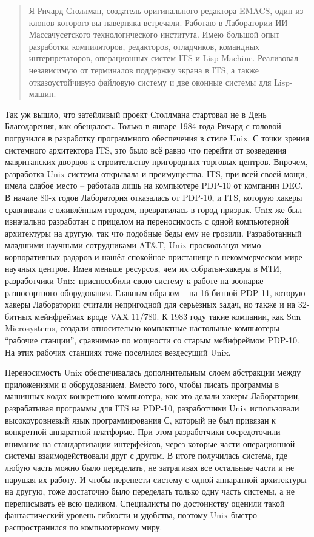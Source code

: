 \begin{quote}
Я Ричард Столлман, создатель оригинального редактора EMACS, один из клонов которого вы наверняка встречали. Работаю в Лаборатории ИИ Массачусетского технологического института. Имею большой опыт разработки компиляторов, редакторов, отладчиков, командных интерпретаторов, операционных систем ITS и Lisp Machine. Реализовал независимую от терминалов поддержку экрана в ITS, а также отказоустойчивую файловую систему и две оконные системы для Lisp-машин.
\end{quote}

Так уж вышло, что затейливый проект Столлмана стартовал не в День Благодарения, как обещалось. Только в январе 1984 года Ричард с головой погрузился в разработку программного обеспечения в стиле Unix. С точки зрения системного архитектора ITS, это было всё равно что перейти от возведения мавританских дворцов к строительству пригородных торговых центров. Впрочем, разработка Unix-системы открывала и преимущества. ITS, при всей своей мощи, имела слабое место -- работала лишь на компьютере PDP-10 от компании DEC. В начале 80-х годов Лаборатория отказалась от PDP-10, и ITS, которую хакеры сравнивали с оживлённым городом, превратилась в город-призрак. Unix же был изначально разработан с прицелом на переносимость с одной компьютерной архитектуры на другую, так что подобные беды ему не грозили. Разработанный младшими научными сотрудниками AT\&T, Unix проскользнул мимо корпоративных радаров и нашёл спокойное пристанище в некоммерческом мире научных центров. Имея меньше ресурсов, чем их собратья-хакеры в МТИ, разработчики Unix приспособили свою систему к работе на зоопарке разносортного оборудования. Главным образом -- на 16-битной PDP-11, которую хакеры Лаборатории считали непригодной для серьёзных задач, но также и на 32-битных мейнфреймах вроде VAX 11/780. К 1983 году такие компании, как Sun Microsystems, создали относительно компактные настольные компьютеры -- \enquote{рабочие станции}, сравнимые по мощности со старым мейнфреймом PDP-10. На этих рабочих станциях тоже поселился вездесущий Unix.

Переносимость Unix обеспечивалась дополнительным слоем абстракции между приложениями и оборудованием. Вместо того, чтобы писать программы в машинных кодах конкретного компьютера, как это делали хакеры Лаборатории, разрабатывая программы для ITS на PDP-10, разработчики Unix использовали высокоуровневый язык программирования С, который не был привязан к конкретной аппаратной платформе. При этом разработчики сосредоточили внимание на стандартизации интерфейсов, через которые части операционной системы взаимодействовали друг с другом. В итоге получилась система, где любую часть можно было переделать, не затрагивая все остальные части и не нарушая их работу. И чтобы перенести систему с одной аппаратной архитектуры на другую, тоже достаточно было переделать только одну часть системы, а не переписывать её всю целиком. Специалисты по достоинству оценили такой фантастический уровень гибкости и удобства, поэтому Unix быстро распространился по компьютерному миру. 

